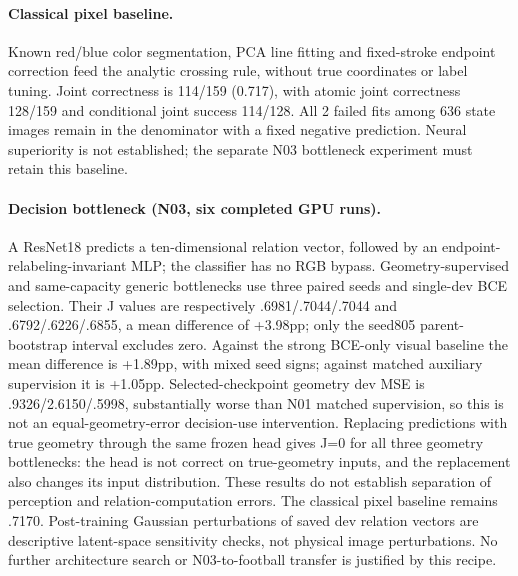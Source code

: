 \paragraph{Classical pixel baseline.} Known red/blue color segmentation, PCA line fitting and fixed-stroke endpoint correction feed the analytic crossing rule, without true coordinates or label tuning. Joint correctness is 114/159 (0.717), with atomic joint correctness 128/159 and conditional joint success 114/128. All 2 failed fits among 636 state images remain in the denominator with a fixed negative prediction. Neural superiority is not established; the separate N03 bottleneck experiment must retain this baseline.


\paragraph{Decision bottleneck (N03, six completed GPU runs).}
A ResNet18 predicts a ten-dimensional relation vector, followed by an endpoint-relabeling-invariant MLP; the classifier has no RGB bypass. Geometry-supervised and same-capacity generic bottlenecks use three paired seeds and single-dev BCE selection. Their J values are respectively .6981/.7044/.7044 and .6792/.6226/.6855, a mean difference of +3.98pp; only the seed805 parent-bootstrap interval excludes zero. Against the strong BCE-only visual baseline the mean difference is +1.89pp, with mixed seed signs; against matched auxiliary supervision it is +1.05pp. Selected-checkpoint geometry dev MSE is .9326/2.6150/.5998, substantially worse than N01 matched supervision, so this is not an equal-geometry-error decision-use intervention. Replacing predictions with true geometry through the same frozen head gives J=0 for all three geometry bottlenecks: the head is not correct on true-geometry inputs, and the replacement also changes its input distribution. These results do not establish separation of perception and relation-computation errors. The classical pixel baseline remains .7170. Post-training Gaussian perturbations of saved dev relation vectors are descriptive latent-space sensitivity checks, not physical image perturbations. No further architecture search or N03-to-football transfer is justified by this recipe.

